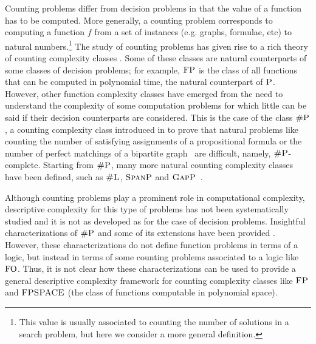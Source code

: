 Counting problems differ from decision problems in that the value of a function has to be computed.
More generally, a counting problem corresponds to computing a function $f$ from a set of instances (e.g. graphs, formulae, etc) to natural numbers.\footnote{This value is usually associated to counting the number of solutions
	in a search problem, but here we consider a more general definition.} 
The study of counting problems has given rise to a rich theory of counting complexity classes \cite{HV95,F97,arora2009computational}. Some of these classes are natural counterparts of some classes of decision problems; for example, $\text{\sc FP}$ 
is the class of all functions that can be computed in polynomial time, 
the natural counterpart of $\text{\sc P}$.
However, other function complexity classes have emerged from the need to understand the complexity of some computation problems for which little can be said if their decision counterparts are considered. This is the case of the class $\text{\sc \#P}$, a counting complexity class introduced in \cite{Valiant79} to prove that natural problems like counting the number of satisfying assignments of a propositional formula or the number of perfect matchings of a bipartite graph~\cite{Valiant79} are difficult, namely, $\text{\sc \#P}$-complete.
Starting from $\text{\sc \#P}$,
many more natural 
counting complexity classes have been defined, such as 
$\text{\sc \#L}$, $\text{\sc SpanP}$ and $\text{\sc GapP}$~\cite{HV95,F97}.

Although counting problems play a prominent role in computational complexity, descriptive complexity for this type of problems has not been systematically studied and it is not as developed as for the case of decision problems. Insightful characterizations of $\text{\sc \#P}$ and some of its extensions have been provided \cite{SalujaST95,ComptonG96}. However, these characterizations do not define function problems in terms of a logic, but instead in terms of some counting problems associated to a logic like ${\rm FO}$. Thus, it is not clear how these characterizations can be used to provide a general descriptive complexity framework for counting complexity classes like $\text{\sc FP}$ and $\text{\sc FPSPACE}$ (the class of functions computable in polynomial space). 

